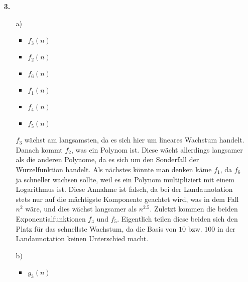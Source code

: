 \documentclass[a4paper,11pt]{article}
\begin{document}
\begin{enumerate}
\begin{enumerate}
                \end{enumerate}

            \item[\textbf{3.}]
                \begin{enumerate}
                    \item[a)]
                        \begin{itemize}
                            \item $f_3(n)$\\
                            \item $f_2(n)$\\
                            \item $f_6(n)$\\
                            \item $f_1(n)$\\
                            \item $f_4(n)$\\
                            \item $f_5(n)$\\
                        \end{itemize}
                        $f_3$ wächst am langsamsten, da es sich hier um lineares
                        Wachstum handelt. Danach kommt $f_2$, was ein Polynom ist.
                        Diese wächt allerdings langsamer als die anderen Polynome,
                        da es sich um den Sonderfall der Wurzelfunktion handelt.
                        Als nächstes könnte man denken käme $f_1$, da $f_6$ ja
                        schneller wachsen sollte, weil es ein Polynom multipliziert
                        mit einem Logarithmus ist. Diese Annahme ist falsch,
                        da bei der Landaunotation stets nur auf die mächtigste
                        Komponente geachtet wird, was in dem Fall $n^2$ wäre, und
                        dies wächst langsamer als $n^{2.5}$. Zuletzt kommen
                        die beiden Exponentialfunktionen $f_4$ und $f_5$.
                        Eigentlich teilen diese beiden sich den Platz für das
                        schnellste Wachstum, da die Basis von $10$ bzw. $100$
                        in der Landaunotation keinen Unterschied macht.
                    \item[b)]
                        \begin{itemize}
                            \item $g_3(n)$\\

\end{itemize}
\end{enumerate}
\end{enumerate}
\end{document}
